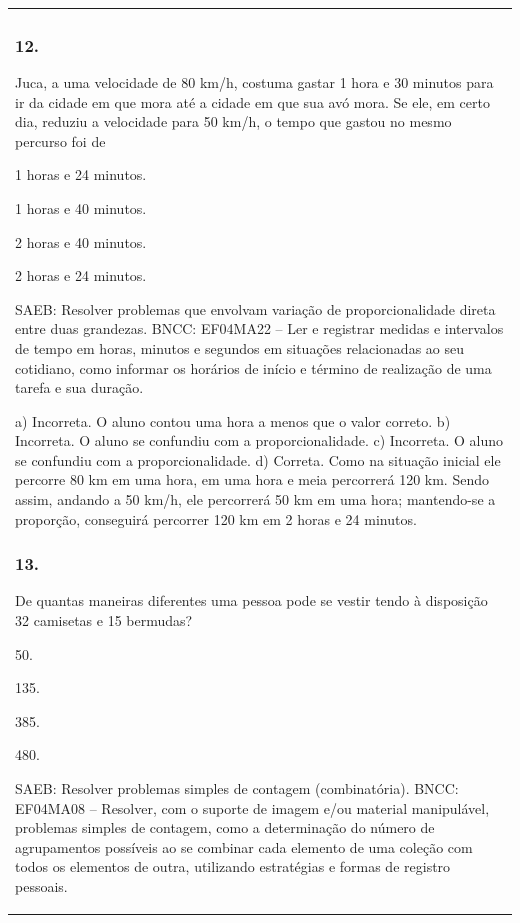 \begin{mdframed}[linewidth=2pt,linecolor=salmao,roundcorner=2pt]
\begin{escolha}
{{{\begin{longtable}[]{@{}l@{}}
\begin{itemize}
{\subsubsection{12.}

Juca, a uma velocidade de 80 km/h, costuma gastar 1 hora e 30 minutos
para ir da cidade em que mora até a cidade em que sua avó mora. Se ele,
em certo dia, reduziu a velocidade para 50 km/h, o tempo que gastou no mesmo percurso foi de

\begin{escolha}
\item
  1 horas e 24 minutos.
\item
  1 horas e 40 minutos.
\item
  2 horas e 40 minutos.
\item
  2 horas e 24 minutos.
\end{escolha}

SAEB: Resolver problemas que envolvam variação de
proporcionalidade direta entre duas grandezas.
BNCC: EF04MA22 -- Ler e registrar medidas e intervalos de tempo em horas, minutos e segundos em
situações relacionadas ao seu cotidiano, como informar os horários de início e término de realização
de uma tarefa e sua duração.

a) Incorreta. O aluno contou uma hora a menos que o valor correto.
b) Incorreta. O aluno se confundiu com a proporcionalidade.
c) Incorreta. O aluno se confundiu com a proporcionalidade.
d) Correta. Como na situação inicial ele percorre 80 km em uma hora, em uma hora e
meia percorrerá 120 km. Sendo assim, andando a 50 km/h, ele percorrerá 50 km em uma hora;
mantendo-se a proporção, conseguirá percorrer 120 km em 2 horas e 24
minutos.

\subsubsection{13. }

De quantas maneiras diferentes uma pessoa pode se vestir tendo à
disposição 32 camisetas e 15 bermudas?

\begin{escolha}
\item
  50.
\item
  135.
\item
  385.
\item
  480.
\end{escolha}

SAEB: Resolver problemas simples de contagem (combinatória).
BNCC: EF04MA08 -- Resolver, com o suporte de imagem e/ou material manipulável, problemas simples
de contagem, como a determinação do número de agrupamentos possíveis ao se combinar cada
elemento de uma coleção com todos os elementos de outra, utilizando estratégias e formas de
registro pessoais.

}
\end{itemize}
\end{longtable}}}}
\end{escolha}
\end{mdframed}
